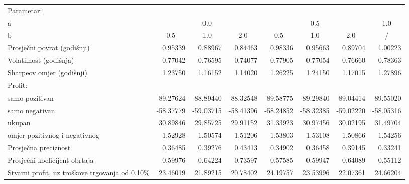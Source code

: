 \begin{sidewaystable}[htb]
  \centering
  \label{table:results-1}
  \begin{tabularx}{\hsize}{Xrrrrrrr}
    \toprule
    Parametar: & & & & & & & \\
    \quad a & \multicolumn{3}{c}{0.0} & \multicolumn{3}{c}{0.5} & \multicolumn{1}{c}{1.0} \\ \cmidrule(lr){2-4} \cmidrule(lr){5-7} \cmidrule(lr){8-8}
    \quad b & \multicolumn{1}{c}{0.5} & \multicolumn{1}{c}{1.0} & \multicolumn{1}{c}{2.0} & \multicolumn{1}{c}{0.5} & \multicolumn{1}{c}{1.0} & \multicolumn{1}{c}{2.0} & \multicolumn{1}{c}{/} \\ \midrule
    Prosječni povrat (godišnji) & 0.95339 & 0.88967 & 0.84463 & 0.98336 & 0.95663 & 0.89704 & 1.00223 \\
    Volatilnost (godišnja) & 0.77042 & 0.76595 & 0.74077 & 0.77905 & 0.77054 & 0.76660 & 0.78363 \\
    Sharpeov omjer (godišnji) & 1.23750 & 1.16152 & 1.14020 & 1.26225 & 1.24150 & 1.17015 & 1.27896 \\ \midrule
    Profit: &  &  &  &  &  &  &  \\
    \quad samo pozitivan & 89.27624 & 88.89440 & 88.32548 & 89.58775 & 89.29840 & 89.04414 & 89.55020 \\
    \quad samo negativan & -58.37779 & -59.03715 & -58.41396 & -58.24852 & -58.32385 & -59.02220 & -58.05316 \\
    \quad ukupan & 30.89846 & 29.85725 & 29.91152 & 31.33923 & 30.97456 & 30.02195 & 31.49704 \\
    \quad omjer pozitivnog i negativnog & 1.52928 & 1.50574 & 1.51206 & 1.53803 & 1.53108 & 1.50866 & 1.54256 \\ \midrule
    Prosječna preciznost & 0.36485 & 0.39276 & 0.43413 & 0.34902 & 0.36458 & 0.39145 & 0.33241 \\
    Prosječni koeficijent obrtaja & 0.59976 & 0.64224 & 0.73597 & 0.57585 & 0.59947 & 0.64089 & 0.55112 \\ \midrule
    Stvarni profit, uz troškove trgovanja od 0.10\% & 23.46019 & 21.89215 & 20.78402 & 24.19757 & 23.53996 & 22.07361 & 24.66204 \\ \bottomrule
  \end{tabularx}
\end{sidewaystable}
